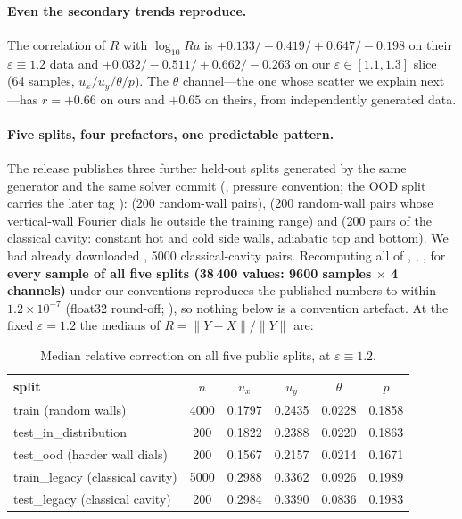 \documentclass[11pt,a4paper]{article}
\begin{document}
\paragraph{Even the secondary trends reproduce.} The correlation of $R$ with $\log_{10}Ra$ is
$+0.133/-0.419/+0.647/-0.198$ on their $\varepsilon\equiv1.2$ data and
$+0.032/-0.511/+0.662/-0.263$ on our $\varepsilon\in[1.1,1.3]$ slice (64 samples,
$u_x/u_y/\theta/p$). The $\theta$ channel---the one whose scatter we explain next---has $r=+0.66$ on
ours and $+0.65$ on theirs, from independently generated data.

\paragraph{Five splits, four prefactors, one predictable pattern.} The release publishes three
further held-out splits generated by the same generator and the same solver commit
(,  pressure convention; the OOD split
carries the later tag ):  (200
random-wall pairs),  (200 random-wall pairs whose vertical-wall Fourier dials lie
outside the training range) and  (200 pairs of the classical cavity: constant
hot and cold side walls, adiabatic top and bottom). We had already downloaded
, 5000 classical-cavity pairs. Recomputing all of ,
, ,  for \textbf{every sample of all five
splits (38\,400 values: 9600 samples $\times$ 4 channels)} under our conventions reproduces the
published numbers to within $1.2\times10^{-7}$ (float32 round-off;
), so nothing below is a convention artefact. At the fixed
$\varepsilon=1.2$ the medians of $R=\|Y-X\|/\|Y\|$ are:

\begin{table}[htbp]
\centering
\small
\caption{Median relative correction on all five public splits, at $\varepsilon\equiv1.2$.}
\label{tab:splits}
\begin{tabular}{@{}lccccc@{}}
\toprule
split & $n$ & $u_x$ & $u_y$ & $\theta$ & $p$\\
\midrule
train (random walls) & 4000 & 0.1797 & 0.2435 & 0.0228 & 0.1858\\
test\_in\_distribution & 200 & 0.1822 & 0.2388 & 0.0220 & 0.1863\\
test\_ood (harder wall dials) & 200 & 0.1567 & 0.2157 & 0.0214 & 0.1671\\
train\_legacy (classical cavity) & 5000 & 0.2988 & 0.3362 & 0.0926 & 0.1989\\
test\_legacy (classical cavity) & 200 & 0.2984 & 0.3390 & 0.0836 & 0.1983\\
\bottomrule
\end{tabular}
\end{table}
\end{document}
